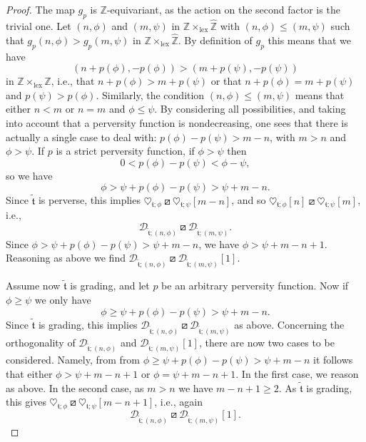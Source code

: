 \documentclass{article}
\theoremstyle{definition}
\newcommand{\Z}{\mathbb{Z}}
\newcommand{\tee}{\mathfrak{t}}
\newcommand{\orth}{\boxslash}
\begin{document}
\begin{proof}
The map $g_p$ is $\Z$-equivariant, as the action on the second factor is the trivial one.  Let $(n,\phi)$ and $(m,\psi)$ in $\Z\times_{\mathrm{lex}} \hat{\Z}$ with $(n,\phi)\leq (m,\psi)$ such that $g_p(n,\phi)>g_p(m,\psi)$ in $\Z\times_{\mathrm{lex}} \hat{\Z}$. By definition of $g_p$ this means that we have
\[
(n+p(\phi),-p(\phi))>(m+p(\psi),-p(\psi))
\]
in $\Z\times_{\mathrm{lex}} \Z$, i.e., that $n+p(\phi)>m+p(\psi)$ or that $n+p(\phi)=m+p(\psi)$ and $p(\psi)>p(\phi)$. Similarly, the condition $(n,\phi)\leq (m,\psi)$ means that either $n<m$ or $n=m$ and $\phi\leq \psi$. By considering all possibilities, and taking into account that a perversity function is nondecreasing, one sees that there is actually a single case to deal with:
$p(\phi)-p(\psi)>m-n$, with $m>n$ and $\phi>\psi$.
If $p$ is a strict perversity function, if $\phi> \psi$ then
\[
0< p(\phi)-p(\psi)< \phi-\psi,
\]
so we have
\[
\phi> \psi+ p(\phi)-p(\psi)>\psi+m-n.
\]
Since $\tilde{\tee}$ is perverse, this implies $\heartsuit_{\tee;\phi}\orth\heartsuit_{\tee;\psi}[m-n]$, and so $\heartsuit_{\tee;\phi}[n]\orth \heartsuit_{\tee;\psi}[m]$, i.e.,
\[
\mathscr{D}_{\tilde{\tee};(n,\phi)}\orth\mathscr{D}_{\tilde{\tee};(m,\psi)}.
\]
Since $\phi>\psi+ p(\phi)-p(\psi)>\psi+m-n$, we have $\phi>\psi+m-n+1$. Reasoning as above we find $\mathscr{D}_{\tilde{\tee};(n,\phi)}\orth\mathscr{D}_{\tilde{\tee};(m,\psi)}[1]$. 
\par
Assume now $\tilde{\tee}$ is grading, and let $p$ be an arbitrary perversity function. Now if $\phi\geq \psi$ we only have
\[
\phi\geq \psi+ p(\phi)-p(\psi)>\psi+m-n.
\]
Since $\tilde{\tee}$ is grading, this implies $\mathscr{D}_{\tilde{\tee};(n,\phi)}\orth\mathscr{D}_{\tilde{\tee};(m,\psi)}$ as above. Concerning the orthogonality of $\mathscr{D}_{\tilde{\tee};(n,\phi)}$ and $\mathscr{D}_{\tilde{\tee};(m,\psi)}[1]$, there are now two cases to be considered. Namely, from
from $\phi\geq \psi+ p(\phi)-p(\psi)>\psi+m-n$ it follows that either $\phi>\psi+m-n+1$ or $\phi=\psi+m-n+1$. In the first case, we reason as above. In the second case, as $m>n$ we have $m-n+1\geq 2$. As $\tilde{\tee}$ is grading, this gives $\heartsuit_{\tee;\phi}\orth\heartsuit_{\tee;\psi}[m-n+1]$, i.e., again
\[
\mathscr{D}_{\tilde{\tee};(n,\phi)}\orth\mathscr{D}_{\tilde{\tee};(m,\psi)}[1].
\]

\end{proof}
\end{document}
